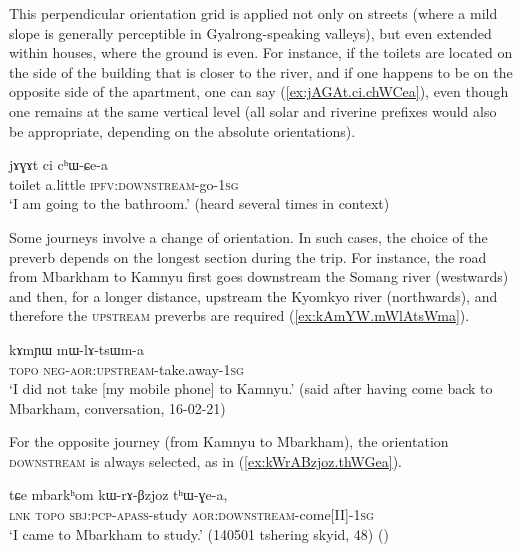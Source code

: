This perpendicular orientation grid is applied not only on streets (where a mild slope is generally perceptible in Gyalrong-speaking valleys), but even extended within houses, where the ground is even. For instance, if the toilets are located on the side of the building that is closer to the river, and if one happens to be on the opposite side of the apartment, one can say (\ref{ex:jAGAt.ci.chWCea}), even though one remains at the same vertical level (all solar and riverine prefixes would also be appropriate, depending on the absolute orientations).

 \begin{exe}
\ex \label{ex:jAGAt.ci.chWCea}
\gll  jɤɣɤt ci cʰɯ-ɕe-a \\
toilet a.little \textsc{ipfv}:\textsc{downstream}-go-\textsc{1sg} \\
\glt `I am going to the bathroom.' (heard several times in context)
\end{exe}
 
Some journeys involve a change of orientation. In such cases, the choice of the preverb depends on the longest section during the trip. For instance, the road from Mbarkham to Kamnyu first goes downstream the Somang river (westwards) and then, for a longer distance, upstream the Kyomkyo river (northwards), and therefore the \textsc{upstream} preverbs are required (\ref{ex:kAmYW.mWlAtsWma}). 

 \begin{exe}
\ex \label{ex:kAmYW.mWlAtsWma}
\gll kɤmɲɯ mɯ-lɤ-tsɯm-a \\
\textsc{topo} \textsc{neg}-\textsc{aor}:\textsc{upstream}-take.away-\textsc{1sg} \\
\glt `I did not take  [my mobile phone] to Kamnyu.' (said after having come back to Mbarkham, conversation, 16-02-21)
\end{exe}

For the opposite journey (from Kamnyu to Mbarkham), the orientation \textsc{downstream} is always selected, as in (\ref{ex:kWrABzjoz.thWGea}).

 \begin{exe}
\ex \label{ex:kWrABzjoz.thWGea}
\gll tɕe mbarkʰom kɯ-rɤ-βzjoz tʰɯ-ɣe-a, \\
\textsc{lnk}  \textsc{topo} \textsc{sbj}:\textsc{pcp}-\textsc{apass}-study \textsc{aor}:\textsc{downstream}-come[II]-\textsc{1sg} \\
\glt `I came to Mbarkham to study.' (140501 tshering skyid, 48) ()
\end{exe}
 
